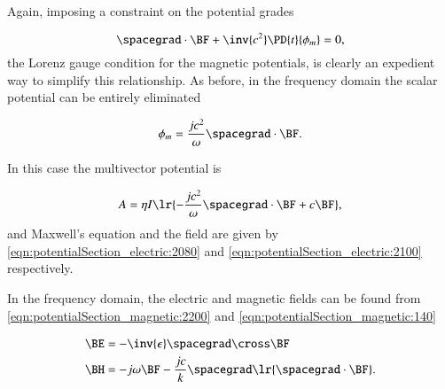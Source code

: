 Again, imposing a constraint on the potential grades

\begin{dmath}\label{eqn:potentialSection_magnetic:2180}
\spacegrad \cdot \BF
+ \inv{c^2}
\PD{t}{\phi_m}
= 0,
\end{dmath}
the Lorenz gauge condition for the magnetic potentials, is clearly an expedient way to simplify this relationship.
As before, in the frequency domain the scalar potential can be entirely eliminated

\begin{dmath}\label{eqn:potentialSection_magnetic:2200}
\phi_m = \frac{j c^2}{\omega} \spacegrad \cdot \BF.
\end{dmath}

In this case the
multivector potential is

\begin{dmath}\label{eqn:potentialSection_magnetic:2220}
A =
\eta I \lr{
-\frac{j c^2}{\omega} \spacegrad \cdot \BF + c \BF
},
\end{dmath}
and Maxwell's equation and the field are given by
\cref{eqn:potentialSection_electric:2080} and
\cref{eqn:potentialSection_electric:2100} respectively.

In the frequency domain, the electric and magnetic fields can be found from
\cref{eqn:potentialSection_magnetic:2200} and \cref{eqn:potentialSection_magnetic:140}

\begin{dmath}\label{eqn:potentialSection_magnetic:2540}
\begin{aligned}
\BE &= -\inv{\epsilon} \spacegrad \cross \BF \\
\BH &=
- j \omega \BF
-\frac{j c}{k} \spacegrad \lr{ \spacegrad \cdot \BF }
.
\end{aligned}
\end{dmath}

%
%
